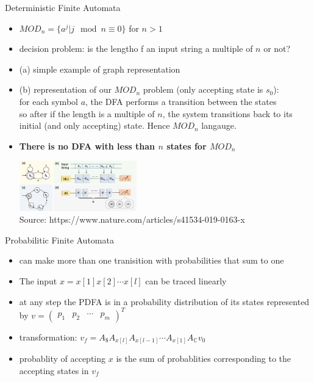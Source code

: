 \documentclass[aspectratio=169,9pt]{beamer}
\begin{document}
\begin{frame}[t]{Deterministic Finite Automata}
  \begin{itemize}
    \item $MOD_n=\{a^j|j \mod n \equiv 0 \}$ for $n>1$
    \item decision problem: is the lengtho f an input string a multiple of $n$ or not?
    \item (a) simple example of graph representation
    \item (b) representation of our $MOD_n$ problem (only accepting state is $s_0$):\\
    for each symbol $a$, the DFA performs a transition between the states\\
    so after if the length is a multiple of $n$, the system transitions back to its initial (and only accepting) state. Hence $MOD_n$ langauge.
    \item \textbf{There is no DFA with less than $n$ states for $MOD_n$}

    \includegraphics[width=0.4\textwidth]{DFA.png}\\
    Source: https://www.nature.com/articles/s41534-019-0163-x
  \end{itemize}
\end{frame}


\begin{frame}[t]{Probabilitic Finite Automata}
  \begin{itemize}
    \item can make more than one tranisition with probabilities that sum to one
    \item The input $x=x[1] x[2] \cdots x[l]$ can be traced linearly
    \item at any step the PDFA is in a probability distribution of its states represented by $v=\left(\begin{array}{llll}p_{1} & p_{2} & \cdots & p_{m}\end{array}\right)^{T}$
    \item transformation: $v_{f}=A_{\$} A_{x[l]} A_{x[l-1]} \cdots A_{x[1]} A_{\mathbb{C}} v_{0}$
    \item probablity of accepting $x$ is the sum of probablities corresponding to the accepting states in $v_f$
  \end{itemize}
\end{frame}
\end{document}
